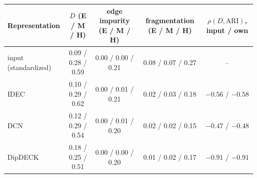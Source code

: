 \begin{tabular}{@{}lcccc@{}}
\toprule
Representation & $D$ (E / M / H) & edge impurity (E / M / H) & fragmentation (E / M / H) & $\rho(D, \text{ARI})$, input / own \\
\midrule
input (standardized) & 0.09 / 0.28 / 0.59 & 0.00 / 0.00 / 0.21 & 0.08 / 0.07 / 0.27 & -- \\
IDEC & 0.10 / 0.29 / 0.62 & 0.00 / 0.01 / 0.21 & 0.02 / 0.03 / 0.18 & $-0.56$ / $-0.58$ \\
DCN & 0.12 / 0.29 / 0.54 & 0.00 / 0.01 / 0.20 & 0.02 / 0.02 / 0.15 & $-0.47$ / $-0.48$ \\
DipDECK & 0.18 / 0.25 / 0.51 & 0.00 / 0.00 / 0.20 & 0.01 / 0.02 / 0.17 & $-0.91$ / $-0.91$ \\
\bottomrule
\end{tabular}
